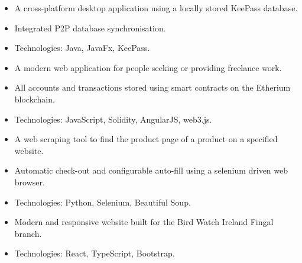\documentclass[9pt,a4paper,ragged2e, normalphoto]{altacv-dean}
\begin{document}
    
    \divider
    


    \begin{itemize}
        \item A cross-platform desktop application using a locally stored KeePass database.
        \item Integrated P2P database synchronisation.
        \item Technologies: Java, JavaFx, KeePass.
    \end{itemize}
    \divider

    \begin{itemize}
        \item  A modern web application for people seeking or providing freelance work.
        \item All accounts and transactions stored using smart contracts on the Etherium blockchain.
        \item Technologies: JavaScript, Solidity, AngularJS, web3.js.
    \end{itemize}
    
\begin{fullwidth}
    \divider
    
    \begin{itemize}
        \item A web scraping tool to find the product page of a product on a specified website.
        \item Automatic check-out and configurable auto-fill using a selenium driven web browser.
        \item Technologies: Python, Selenium, Beautiful Soup.
    \end{itemize}
    \divider
    
    \begin{itemize}
        \item Modern and responsive website built for the Bird Watch Ireland Fingal branch.
        \item Technologies: React, TypeScript, Bootstrap.
    \end{itemize}

\end{fullwidth}
\end{document}
